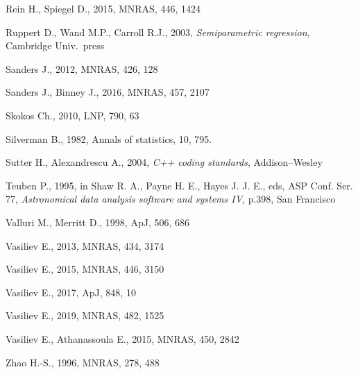 \documentclass[12pt]{article}
\begin{document}
\begin{thebibliography}{99}
Rein H., Spiegel D., 2015, MNRAS, 446, 1424

Ruppert D., Wand M.P., Carroll R.J., 2003, \textsl{Semiparametric regression}, Cambridge Univ.\ press

Sanders J., 2012, MNRAS, 426, 128

Sanders J., Binney J., 2016, MNRAS, 457, 2107

Skokos Ch., 2010, LNP, 790, 63

Silverman B., 1982, Annals of statistics, 10, 795.

Sutter H., Alexandrescu A., 2004, \textsl{C++ coding standards}, Addison--Wesley

Teuben P., 1995, in Shaw R. A., Payne H. E., Hayes J. J. E., eds, ASP Conf. Ser. 77,
\textsl{Astronomical data analysis software and systems IV}, p.398, San Francisco

Valluri M., Merritt D., 1998, ApJ, 506, 686

Vasiliev E., 2013, MNRAS, 434, 3174

Vasiliev E., 2015, MNRAS, 446, 3150

Vasiliev E., 2017, ApJ, 848, 10

Vasiliev E., 2019, MNRAS, 482, 1525

Vasiliev E., Athanassoula E., 2015, MNRAS, 450, 2842

Zhao H.-S., 1996, MNRAS, 278, 488

\end{thebibliography}
\end{document}
